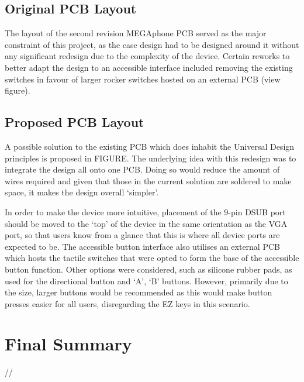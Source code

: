 \subsection{Original PCB Layout}

The layout of the second revision MEGAphone PCB served as the major constraint of this project, as the case design had to be designed around it without any significant redesign due to the complexity of the device. 
Certain reworks to better adapt the design to an accessible interface included removing the existing switches in favour of larger rocker switches hosted on an external PCB (view figure).

\subsection{Proposed PCB Layout}

A possible solution to the existing PCB which does inhabit the Universal Design principles is proposed in FIGURE. 
The underlying idea with this redesign was to integrate the design all onto one PCB. 
Doing so would reduce the amount of wires required and given that those in the current solution are soldered to make space, it makes the design overall ‘simpler’.

In order to make the device more intuitive, placement of the 9-pin DSUB port should be moved to the ‘top’ of the device in the same orientation as the VGA port, so that users know from a glance that this is where all device ports are expected to be.
The accessible button interface also utilises an external PCB which hosts the tactile switches that were opted to form the base of the accessible button function. 
Other options were considered, such as silicone rubber pads, as used for the directional button and ‘A’, ‘B’ buttons. 
However, primarily due to the size, larger buttons would be recommended as this would make button presses easier for all users, disregarding the EZ keys in this scenario.


\section{Final Summary}
//